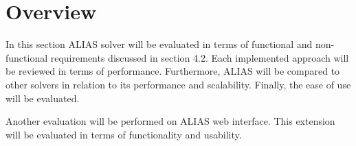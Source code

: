 \section{Overview}
In this section ALIAS solver will be evaluated in terms of functional and non-functional requirements discussed in section 4.2. Each implemented approach will be reviewed in terms of performance. Furthermore, ALIAS will be compared to other solvers in relation to its performance and scalability. Finally, the ease of use will be evaluated.

Another evaluation will be performed on ALIAS web interface. This extension will be evaluated in terms of functionality and usability. 